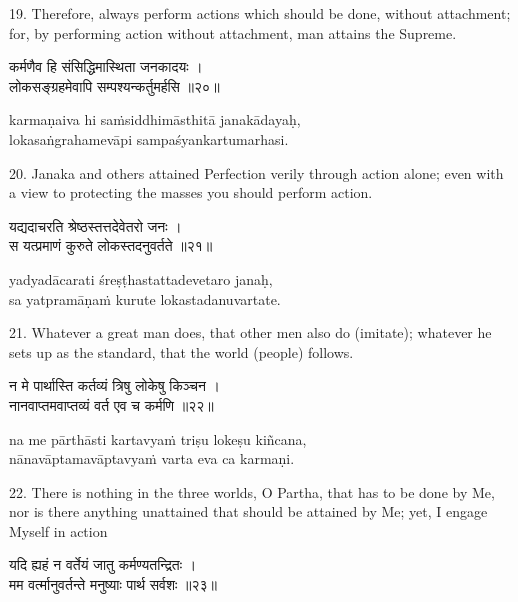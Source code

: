 19. Therefore, always perform actions which should be done, without attachment;
for, by performing action without attachment, man attains the Supreme.

\begin{gitaverse}
कर्मणैव हि संसिद्धिमास्थिता जनकादयः । \\
लोकसङ्ग्रहमेवापि सम्पश्यन्कर्तुमर्हसि ॥२०॥
\end{gitaverse}

\begin{transliteration}
karmaṇaiva hi saṁsiddhimāsthitā janakādayaḥ, \\
lokasaṅgrahamevāpi sampaśyankartumarhasi.
\end{transliteration}

20. Janaka and others attained Perfection verily through action alone; even
with a view to protecting the masses you should perform action.

\begin{gitaverse}
यद्यदाचरति श्रेष्ठस्तत्तदेवेतरो जनः । \\
स यत्प्रमाणं कुरुते लोकस्तदनुवर्तते ॥२१॥
\end{gitaverse}

\begin{transliteration}
yadyadācarati śreṣṭhastattadevetaro janaḥ, \\
sa yatpramāṇaṁ kurute lokastadanuvartate.
\end{transliteration}

21. Whatever a great man does, that other men also do (imitate); whatever he
sets up as the standard, that the world (people) follows.

\begin{gitaverse}
न मे पार्थास्ति कर्तव्यं त्रिषु लोकेषु किञ्चन । \\
नानवाप्तमवाप्तव्यं वर्त एव च कर्मणि ॥२२॥
\end{gitaverse}

\begin{transliteration}
na me pārthāsti kartavyaṁ triṣu lokeṣu kiñcana, \\
nānavāptamavāptavyaṁ varta eva ca karmaṇi.
\end{transliteration}

22. There is nothing in the three worlds, O Partha, that has to be done by Me,
nor is there anything unattained that should be attained by Me; yet, I engage
Myself in action

\begin{gitaverse}
यदि ह्यहं न वर्तेयं जातु कर्मण्यतन्द्रितः । \\
मम वर्त्मानुवर्तन्ते मनुष्याः पार्थ सर्वशः ॥२३॥
\end{gitaverse}

